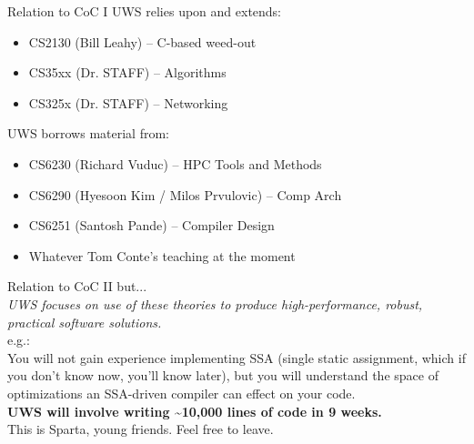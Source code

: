 \documentclass[pdf]{beamer}
\begin{document}
\begin{frame}{Relation to CoC I}
UWS relies upon and extends:
\begin{itemize}
\item CS2130 (Bill Leahy) -- C-based weed-out
\item CS35xx (Dr. STAFF) -- Algorithms
\item CS325x (Dr. STAFF) -- Networking
\end{itemize}
UWS borrows material from:
\begin{itemize}
\item CS6230 (Richard Vuduc) -- HPC Tools and Methods
\item CS6290 (Hyesoon Kim / Milos Prvulovic) -- Comp Arch
\item CS6251 (Santosh Pande) -- Compiler Design
\item Whatever Tom Conte's teaching at the moment
\end{itemize}
\end{frame}

\begin{frame}{Relation to CoC II}
but... \\
\emph{UWS focuses on {\it use} of these theories to produce high-performance,
robust, {\it practical} software solutions.}\linebreak \\
e.g.: \\
You will not gain experience implementing SSA (single static
assignment, which if you don't know now, you'll know later), but you will
understand the space of optimizations an SSA-driven compiler can effect on your
code.\linebreak \\
{\bf UWS will involve writing \~{}10,000 lines of code in 9 weeks.}\linebreak \\
This is Sparta, young friends. Feel free to leave.
\end{frame}
\end{document}
